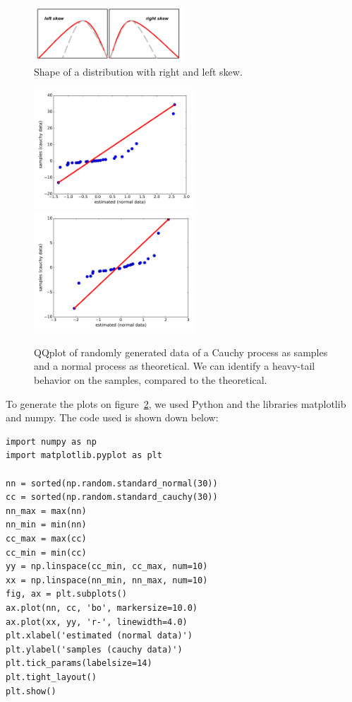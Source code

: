 \begin{figure}[ht!]
	\centering
	\includegraphics[width=0.5\textwidth]{figures/apA/rl-skew}
	\caption{Shape of a distribution with right and left skew.}
	\label{fig:qqplot-rl-skew}
\end{figure}

\begin{figure}[t!]
    \centering
        \includegraphics[width=60mm]{figures/apA/qq-c1}
    \hspace{0mm}
        \includegraphics[width=60mm]{figures/apA/qq-c2}
    \caption{QQplot of randomly generated data of a Cauchy process as samples and a normal process as theoretical. We can identify a heavy-tail behavior on the samples, compared to the theoretical.}
    \label{fig:qq-cauchy}
\end{figure}

To generate the plots on figure~\ref{fig:qq-cauchy}, we used Python and the libraries matplotlib and numpy. The code used is shown down below:
\begin{verbatim}
import numpy as np
import matplotlib.pyplot as plt

nn = sorted(np.random.standard_normal(30))
cc = sorted(np.random.standard_cauchy(30))
nn_max = max(nn)
nn_min = min(nn)
cc_max = max(cc)
cc_min = min(cc)
yy = np.linspace(cc_min, cc_max, num=10)
xx = np.linspace(nn_min, nn_max, num=10)
fig, ax = plt.subplots()
ax.plot(nn, cc, 'bo', markersize=10.0)
ax.plot(xx, yy, 'r-', linewidth=4.0)
plt.xlabel('estimated (normal data)')
plt.ylabel('samples (cauchy data)')
plt.tick_params(labelsize=14)
plt.tight_layout()
plt.show()
\end{verbatim}



